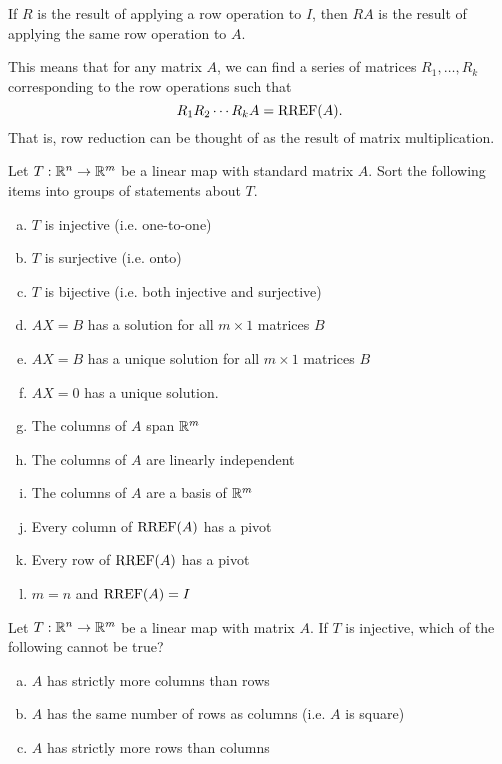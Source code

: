 \begin{applicationActivities}
\begin{fact}
If \(R\) is the result of applying a row operation to \(I\), then
\(RA\) is the result of applying the same row operation to \(A\).

This means that for any matrix $A$, we can find a series of matrices $R_1, \ldots, R_k$ corresponding to the row operations such that $$R_1 R_2 \cdots R_k A = \operatorname{RREF}(A).$$ That is, row reduction can be thought of as the result
of matrix multiplication.
\end{fact}


\begin{activity}{15}
Let $T: \mathbb{R}^n \rightarrow \mathbb{R}^m$ be a linear map with standard matrix $A$.
Sort the following items into groups of statements about $T$.
\begin{multicols}{2}
\begin{enumerate}[(a)]
\item $T$ is injective (i.e. one-to-one)
\item $T$ is surjective (i.e. onto)
\item $T$ is bijective (i.e. both injective and surjective)
\item $AX=B$ has a solution for all $m \times 1$ matrices $B$
\item $AX=B$ has a unique solution for all $m \times 1$ matrices $B$
\item $AX=0$ has a unique solution.
\item The columns of $A$ span $\mathbb{R}^m$
\item The columns of $A$ are linearly independent
\item The columns of $A$ are a basis of $\mathbb{R}^m$
\item Every column of $\operatorname{RREF}(A)$ has a pivot
\item Every row of $\operatorname{RREF}(A)$ has a pivot
\item $m=n$ and $\operatorname{RREF}(A)=I$
\end{enumerate}
\end{multicols}
\end{activity}

\begin{activity}{5}
Let $T: \mathbb{R}^n \rightarrow \mathbb{R}^m$ be a linear map with matrix $A$.
If $T$ is injective, which of the following cannot be true?
\begin{enumerate}[(a)]
\item $A$ has strictly more columns than rows
\item $A$ has the same number of rows as columns (i.e. $A$ is square)
\item $A$ has strictly more rows than columns
\end{enumerate}
\end{activity}


\end{applicationActivities}
